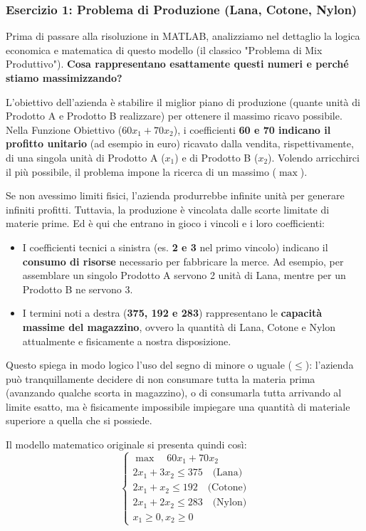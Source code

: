 \documentclass[12pt, a4paper]{article}
\begin{document}
	\subsubsection*{Esercizio 1: Problema di Produzione (Lana, Cotone, Nylon)}
	Prima di passare alla risoluzione in MATLAB, analizziamo nel dettaglio la logica economica e matematica di questo modello (il classico "Problema di Mix Produttivo"). \textbf{Cosa rappresentano esattamente questi numeri e perché stiamo massimizzando?}
	
	L'obiettivo dell'azienda è stabilire il miglior piano di produzione (quante unità di Prodotto A e Prodotto B realizzare) per ottenere il massimo ricavo possibile. 
	Nella Funzione Obiettivo ($60x_1 + 70x_2$), i coefficienti \textbf{60 e 70 indicano il profitto unitario} (ad esempio in euro) ricavato dalla vendita, rispettivamente, di una singola unità di Prodotto A ($x_1$) e di Prodotto B ($x_2$). Volendo arricchirci il più possibile, il problema impone la ricerca di un massimo ($\max$).
	
	Se non avessimo limiti fisici, l'azienda produrrebbe infinite unità per generare infiniti profitti. Tuttavia, la produzione è vincolata dalle scorte limitate di materie prime. Ed è qui che entrano in gioco i vincoli e i loro coefficienti:
	\begin{itemize}
		\item I coefficienti tecnici a sinistra (es. \textbf{2 e 3} nel primo vincolo) indicano il \textbf{consumo di risorse} necessario per fabbricare la merce. Ad esempio, per assemblare un singolo Prodotto A servono 2 unità di Lana, mentre per un Prodotto B ne servono 3.
		\item I termini noti a destra (\textbf{375, 192 e 283}) rappresentano le \textbf{capacità massime del magazzino}, ovvero la quantità di Lana, Cotone e Nylon attualmente e fisicamente a nostra disposizione.
	\end{itemize}
	
	Questo spiega in modo logico l'uso del segno di minore o uguale ($\leq$): l'azienda può tranquillamente decidere di non consumare tutta la materia prima (avanzando qualche scorta in magazzino), o di consumarla tutta arrivando al limite esatto, ma è fisicamente impossibile impiegare una quantità di materiale superiore a quella che si possiede.
	
	Il modello matematico originale si presenta quindi così:
	\[
	\begin{cases}
		\max \quad 60x_1 + 70x_2 \\
		2x_1 + 3x_2 \leq 375 \quad \text{(Lana)} \\
		2x_1 + x_2 \leq 192 \quad \text{(Cotone)} \\
		2x_1 + 2x_2 \leq 283 \quad \text{(Nylon)} \\
		x_1 \geq 0, x_2 \geq 0
	\end{cases}
	\]
	
\end{document}
